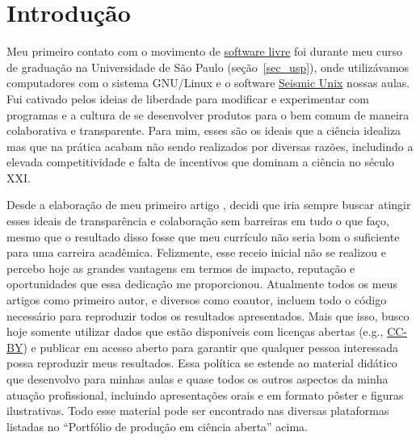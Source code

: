 \documentclass[10pt,a4paper,oneside]{book}
\begin{document}
\section{Introdução}

Meu primeiro contato com o movimento de \href{https://www.fsf.org/}{software livre}
foi durante meu curso de graduação na Universidade de São Paulo (seção~\ref{sec_usp}),
onde utilizávamos computadores com o sistema GNU/Linux e o software
\href{https://en.wikipedia.org/wiki/Seismic_Unix}{Seismic Unix} nossas aulas.
Fui cativado pelos ideias de liberdade para modificar e experimentar com
programas e a cultura de se desenvolver produtos para o bem comum de maneira
colaborativa e transparente.
Para mim, esses são os ideais que a ciência idealiza mas que na prática acabam
não sendo realizados por diversas razões, includindo a elevada competitividade
e falta de incentivos que dominam a ciência no século XXI.

Desde a elaboração de meu primeiro artigo \citep{Uieda2012}, decidi que iria
sempre buscar atingir esses ideais de transparência e colaboração sem barreiras
em tudo o que faço, mesmo que o resultado disso fosse que meu currículo não
seria bom o suficiente para uma carreira acadêmica.
Felizmente, esse receio inicial não se realizou e percebo hoje as grandes
vantagens em termos de impacto, reputação e oportunidades que essa dedicação me
proporcionou.
Atualmente todos os meus artigos como primeiro autor, e diversos como coautor,
incluem todo o código necessário para reproduzir todos os resultados
apresentados.
Mais que isso, busco hoje somente utilizar dados que estão disponíveis com
licenças abertas (e.g., \href{https://creativecommons.org/licenses/by/4.0/}{CC-BY})
e publicar em acesso aberto para garantir que qualquer pessoa interessada
possa reproduzir meus resultados.
Essa política se estende ao material didático que desenvolvo para minhas aulas
e quase todos os outros aspectos da minha atuação profissional, incluindo
apresentações orais e em formato pôster e figuras ilustrativas.
Todo esse material pode ser encontrado nas diversas plataformas listadas no
``Portfólio de produção em ciência aberta'' acima.
\end{document}
